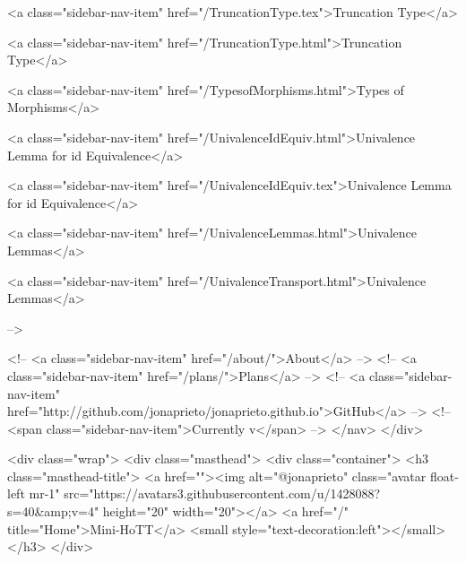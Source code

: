       
    
      
        
          <a class="sidebar-nav-item" href="/TruncationType.tex">Truncation Type</a>
        
      
    
      
        
          <a class="sidebar-nav-item" href="/TruncationType.html">Truncation Type</a>
        
      
    
      
        
          <a class="sidebar-nav-item" href="/TypesofMorphisms.html">Types of Morphisms</a>
        
      
    
      
        
          <a class="sidebar-nav-item" href="/UnivalenceIdEquiv.html">Univalence Lemma for id Equivalence</a>
        
      
    
      
        
          <a class="sidebar-nav-item" href="/UnivalenceIdEquiv.tex">Univalence Lemma for id Equivalence</a>
        
      
    
      
        
          <a class="sidebar-nav-item" href="/UnivalenceLemmas.html">Univalence Lemmas</a>
        
      
    
      
        
          <a class="sidebar-nav-item" href="/UnivalenceTransport.html">Univalence Lemmas</a>
        
      
     -->

    <!-- <a class="sidebar-nav-item" href="/about/">About</a> -->
    <!-- <a class="sidebar-nav-item" href="/plans/">Plans</a> -->
    <!-- <a class="sidebar-nav-item" href="http://github.com/jonaprieto/jonaprieto.github.io">GitHub</a> -->
    <!-- <span class="sidebar-nav-item">Currently v</span> -->
  </nav>
</div>

    <div class="wrap">
      <div class="masthead">
        <div class="container">
          <h3 class="masthead-title">
            <a href=""><img alt="@jonaprieto" class="avatar float-left mr-1" src="https://avatars3.githubusercontent.com/u/1428088?s=40&amp;v=4" height="20" width="20"></a>
            <a href="/" title="Home">Mini-HoTT</a>
            <small style="text-decoration:left"></small>
          </h3>
        </div>
      
